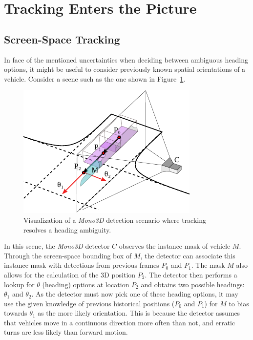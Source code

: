
\section{Tracking Enters the Picture}
\label{sec:tracking}

\subsection{Screen-Space Tracking}
\label{subsec:sstracking}

In face of the mentioned uncertainties when deciding between ambiguous heading options, it might be useful to consider previously known spatial orientations of a vehicle.
Consider a scene such as the one shown in Figure~\ref{fig:tracking}.

\begin{figure}[htb]
    \centering
    \includegraphics[width=0.7\linewidth]{figures/tracking}
    \caption{Visualization of a \textit{Mono3D} detection scenario where tracking resolves a heading ambiguity.}
    \label{fig:tracking}
\end{figure}

In this scene, the \textit{Mono3D} detector $C$ observes the instance mask of vehicle $M$.
Through the screen-space bounding box of $M$, the detector can associate this instance mask with detections from previous frames \textemdash $P_0$ and $P_1$.
The mask $M$ also allows for the calculation of the 3D position $P_2$.
The detector then performs a lookup for $\theta$ (heading) options at location $P_2$ and obtains two possible headings: $\theta_1$ and $\theta_2$.
As the detector must now pick one of these heading options, it may use the given knowledge of previous historical positions ($P_0$ and $P_1$) for $M$ to bias towards $\theta_1$ as the more likely orientation.
This is because the detector assumes that vehicles move in a continuous direction more often than not, and erratic turns are less likely than forward motion.

